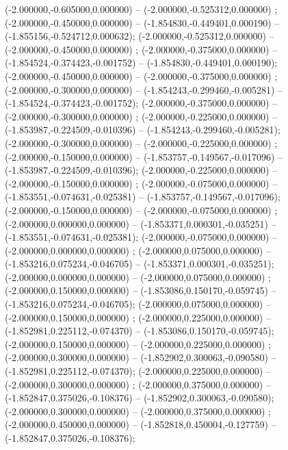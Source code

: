  (-2.000000,-0.605000,0.000000) -- (-2.000000,-0.525312,0.000000) ;
 (-2.000000,-0.450000,0.000000) -- (-1.854830,-0.449401,0.000190) -- (-1.855156,-0.524712,0.000632);
 (-2.000000,-0.525312,0.000000) -- (-2.000000,-0.450000,0.000000) ;
 (-2.000000,-0.375000,0.000000) -- (-1.854524,-0.374423,-0.001752) -- (-1.854830,-0.449401,0.000190);
 (-2.000000,-0.450000,0.000000) -- (-2.000000,-0.375000,0.000000) ;
 (-2.000000,-0.300000,0.000000) -- (-1.854243,-0.299460,-0.005281) -- (-1.854524,-0.374423,-0.001752);
 (-2.000000,-0.375000,0.000000) -- (-2.000000,-0.300000,0.000000) ;
 (-2.000000,-0.225000,0.000000) -- (-1.853987,-0.224509,-0.010396) -- (-1.854243,-0.299460,-0.005281);
 (-2.000000,-0.300000,0.000000) -- (-2.000000,-0.225000,0.000000) ;
 (-2.000000,-0.150000,0.000000) -- (-1.853757,-0.149567,-0.017096) -- (-1.853987,-0.224509,-0.010396);
 (-2.000000,-0.225000,0.000000) -- (-2.000000,-0.150000,0.000000) ;
 (-2.000000,-0.075000,0.000000) -- (-1.853551,-0.074631,-0.025381) -- (-1.853757,-0.149567,-0.017096);
 (-2.000000,-0.150000,0.000000) -- (-2.000000,-0.075000,0.000000) ;
 (-2.000000,0.000000,0.000000) -- (-1.853371,0.000301,-0.035251) -- (-1.853551,-0.074631,-0.025381);
 (-2.000000,-0.075000,0.000000) -- (-2.000000,0.000000,0.000000) ;
 (-2.000000,0.075000,0.000000) -- (-1.853216,0.075234,-0.046705) -- (-1.853371,0.000301,-0.035251);
 (-2.000000,0.000000,0.000000) -- (-2.000000,0.075000,0.000000) ;
 (-2.000000,0.150000,0.000000) -- (-1.853086,0.150170,-0.059745) -- (-1.853216,0.075234,-0.046705);
 (-2.000000,0.075000,0.000000) -- (-2.000000,0.150000,0.000000) ;
 (-2.000000,0.225000,0.000000) -- (-1.852981,0.225112,-0.074370) -- (-1.853086,0.150170,-0.059745);
 (-2.000000,0.150000,0.000000) -- (-2.000000,0.225000,0.000000) ;
 (-2.000000,0.300000,0.000000) -- (-1.852902,0.300063,-0.090580) -- (-1.852981,0.225112,-0.074370);
 (-2.000000,0.225000,0.000000) -- (-2.000000,0.300000,0.000000) ;
 (-2.000000,0.375000,0.000000) -- (-1.852847,0.375026,-0.108376) -- (-1.852902,0.300063,-0.090580);
 (-2.000000,0.300000,0.000000) -- (-2.000000,0.375000,0.000000) ;
 (-2.000000,0.450000,0.000000) -- (-1.852818,0.450004,-0.127759) -- (-1.852847,0.375026,-0.108376);
